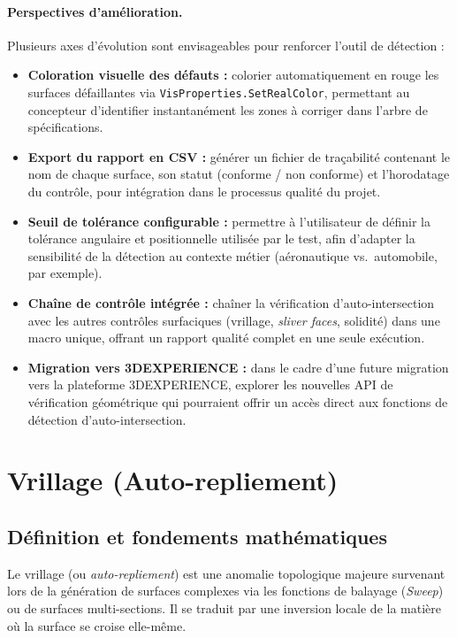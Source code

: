 \paragraph{Perspectives d'amélioration.}
Plusieurs axes d'évolution sont envisageables pour renforcer l'outil de détection :

\begin{itemize}
    \item[•] \textbf{Coloration visuelle des défauts :} colorier automatiquement en rouge les surfaces défaillantes via \texttt{VisProperties.SetRealColor}, permettant au concepteur d'identifier instantanément les zones à corriger dans l'arbre de spécifications.
    \item[•] \textbf{Export du rapport en CSV :} générer un fichier de traçabilité contenant le nom de chaque surface, son statut (conforme / non conforme) et l'horodatage du contrôle, pour intégration dans le processus qualité du projet.
    \item[•] \textbf{Seuil de tolérance configurable :} permettre à l'utilisateur de définir la tolérance angulaire et positionnelle utilisée par le test, afin d'adapter la sensibilité de la détection au contexte métier (aéronautique vs.\ automobile, par exemple).
    \item[•] \textbf{Chaîne de contrôle intégrée :} chaîner la vérification d'auto-intersection avec les autres contrôles surfaciques (vrillage, \textit{sliver faces}, solidité) dans une macro unique, offrant un rapport qualité complet en une seule exécution.
    \item[•] \textbf{Migration vers 3DEXPERIENCE :} dans le cadre d'une future migration vers la plateforme 3DEXPERIENCE, explorer les nouvelles API de vérification géométrique qui pourraient offrir un accès direct aux fonctions de détection d'auto-intersection.
\end{itemize}

\section{Vrillage (Auto-repliement)}

\subsection{Définition et fondements mathématiques}

Le vrillage (ou \textit{auto-repliement}) est une anomalie topologique majeure survenant lors de la génération de surfaces complexes via les fonctions de balayage (\textit{Sweep}) ou de surfaces multi-sections. Il se traduit par une inversion locale de la matière où la surface se croise elle-même.

